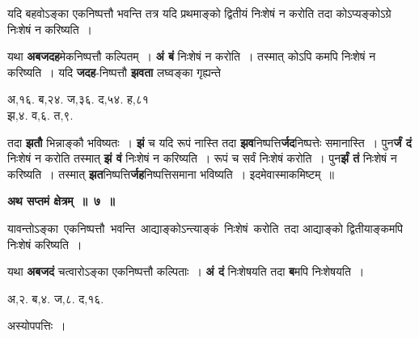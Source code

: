\documentclass[11pt, openany]{book}
\begin{document}
 {\ab यदि बहवोऽङ्का एकनिष्पत्तौ भवन्ति तत्र यदि प्रथमाङ्को द्वितीयं निःशेषं न करोति तदा कोऽप्यङ्कोऽग्रे निःशेषं न करिष्यति~। }\\

\begin{flushleft}
\begin{minipage}[t]{0.5\textwidth}
\hspace{4mm} यथा \textbf{अबजदह}मेकनिष्पत्तौ कल्पितम्~। \textbf{अं बं} निःशेषं न करोति~। तस्मात् कोऽपि कमपि निःशेषं न करिष्यति~। यदि \textbf{जदह}-निष्पत्तौ \textbf{झवता} लघ्वङ्का गृह्यन्ते
\end{minipage} 
\hfill
\begin{minipage}[t]{0.4\textwidth}
\vspace{1mm}

अ,१६. ब,२४. ज,३६. द,५४. ह,८१ \\
झ,४. व,६. त,९.
\end{minipage}
\end{flushleft}

\newpage
\noindent तदा \textbf{झतौ} भिन्नाङ्कौ भविष्यतः~। \textbf{झं} च यदि रूपं नास्ति तदा \textbf{झव}निष्पत्ति\textbf{र्जद}निष्पत्तेः समानास्ति~। पुन\textbf{र्जं दं} निःशेषं न करोति तस्मात् \textbf{झं वं} निःशेषं न करिष्यति~। रूपं च सर्वं निःशेषं करोति~। पुन\textbf{र्झं तं} निःशेषं न करिष्यति~। तस्मात् \textbf{झत}निष्पत्ति\textbf{र्जह}निष्पत्तिसमाना भविष्यति~। इदमेवास्माकमिष्टम्~॥
\vspace{2mm}
 
\begin{center}
\textbf{\large अथ सप्तमं क्षेत्रम्~॥~७~॥}
\end{center}

{\ab यावन्तोऽङ्का \,एकनिष्पत्तौ \,भवन्ति \,आद्याङ्कोऽन्त्याङ्कं \,निःशेषं \,करोति \,तदा आद्याङ्को द्वितीयाङ्कमपि निःशेषं करिष्यति~। }

\begin{flushleft}
\begin{minipage}[t]{0.63\textwidth}
\hspace{4mm} यथा \textbf{अबजदं} चत्वारोऽङ्का एकनिष्पत्तौ कल्पिताः~। \textbf{अं दं} निःशेषयति तदा \textbf{ब}मपि निःशेषयति~।
\end{minipage} 
\hfill
\begin{minipage}[t]{0.3\textwidth}
अ,२. ब,४. ज,८. द,१६.
\end{minipage}
\end{flushleft}
\vspace{-1mm}

\begin{center}
अस्योपपत्तिः~।
\end{center}
\end{document}
